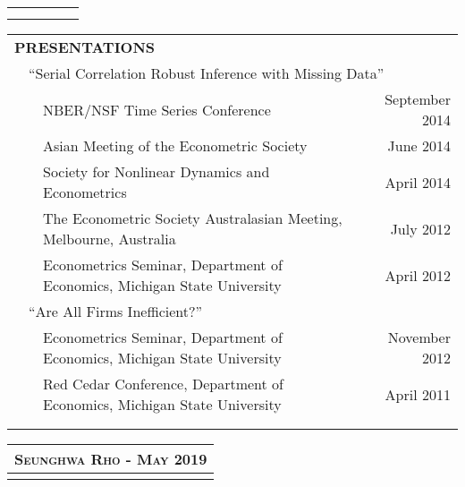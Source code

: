 \documentclass[10pt]{article}
\begin{document}
\begin{center}
\begin{tabular}{llllr}
\multicolumn{5}{p{500pt}}{}\\\\
\end{tabular}
\begin{tabular}{llllr}
\multicolumn{5}{l}{{\Large \textbf{P}}\textbf{RESENTATIONS}}\vspace{0.1cm}\\
&\multicolumn{4}{l}{\textquotedblleft Serial Correlation
Robust Inference with Missing Data\textquotedblright } \\
\multicolumn{1}{l}{} & \multicolumn{1}{l}{} & \multicolumn{2}{l}{
NBER/NSF Time Series Conference} &\multicolumn{1}{r}{September 2014}\\
\multicolumn{1}{l}{} & \multicolumn{1}{l}{} & \multicolumn{2}{l}{
Asian Meeting of the Econometric Society} &\multicolumn{1}{r}{June 2014}\\
\multicolumn{1}{l}{} & \multicolumn{1}{l}{} & \multicolumn{2}{l}{
Society for Nonlinear Dynamics and Econometrics} &\multicolumn{1}{r}{April 2014}\\
\multicolumn{1}{l}{} & \multicolumn{1}{l}{} & \multicolumn{2}{l}{
The Econometric Society Australasian Meeting, Melbourne, Australia} &\multicolumn{1}{r}{July 2012}\\
\multicolumn{1}{l}{} & \multicolumn{1}{l}{} & \multicolumn{2}{l}{
Econometrics Seminar, Department of Economics, Michigan State University} &\multicolumn{1}{r}{April 2012}\vspace{0.2cm}\\
& \multicolumn{4}{l}{ \textquotedblleft Are All Firms Inefficient?\textquotedblright}\\
\multicolumn{1}{l}{} & \multicolumn{1}{l}{} & \multicolumn{2}{l}{
Econometrics Seminar, Department of Economics, Michigan State University} &\multicolumn{1}{r}{November 2012}\\
\multicolumn{1}{l}{} & \multicolumn{1}{l}{} & \multicolumn{2}{l}{
Red Cedar Conference, Department of Economics, Michigan State University} &\multicolumn{1}{r}{April 2011} \\
\multicolumn{5}{p{500pt}}{}\\\\
\end{tabular}


\clearpage

\begin{tabular}{llllr}
\multicolumn{5}{r}{\textsc{Seunghwa Rho - May 2019}} \\ \hline
\multicolumn{5}{p{500pt}}{}\\
\end{tabular}


\end{center}
\end{document}
